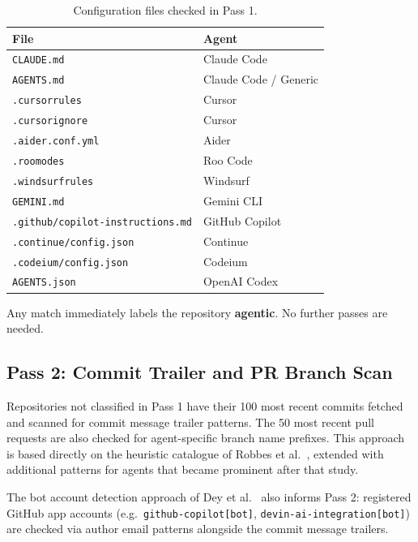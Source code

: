 \documentclass[12pt, a4paper]{article}
\begin{document}
\begin{table}[h]
\centering
\caption{Configuration files checked in Pass 1.}
\begin{tabular}{@{}ll@{}}
\toprule
\textbf{File} & \textbf{Agent} \\
\midrule
\texttt{CLAUDE.md}                        & Claude Code \\
\texttt{AGENTS.md}                        & Claude Code / Generic \\
\texttt{.cursorrules}                     & Cursor \\
\texttt{.cursorignore}                    & Cursor \\
\texttt{.aider.conf.yml}                  & Aider \\
\texttt{.roomodes}                        & Roo Code \\
\texttt{.windsurfrules}                   & Windsurf \\
\texttt{GEMINI.md}                        & Gemini CLI \\
\texttt{.github/copilot-instructions.md}  & GitHub Copilot \\
\texttt{.continue/config.json}            & Continue \\
\texttt{.codeium/config.json}             & Codeium \\
\texttt{AGENTS.json}                      & OpenAI Codex \\
\bottomrule
\end{tabular}
\end{table}

Any match immediately labels the repository \textbf{agentic}. No further
passes are needed.

\subsection{Pass 2: Commit Trailer and PR Branch Scan}

Repositories not classified in Pass 1 have their 100 most recent commits
fetched and scanned for commit message trailer patterns. The 50 most recent
pull requests are also checked for agent-specific branch name prefixes. This
approach is based directly on the heuristic catalogue of Robbes et
al.~\cite{robbesHeuristics2026}, extended with additional patterns for agents
that became prominent after that study.

The bot account detection approach of Dey et al.~\cite{dey2020biman} also
informs Pass 2: registered GitHub app accounts (e.g.\
\texttt{github-copilot[bot]}, \texttt{devin-ai-integration[bot]}) are
checked via author email patterns alongside the commit message trailers.
\end{document}
